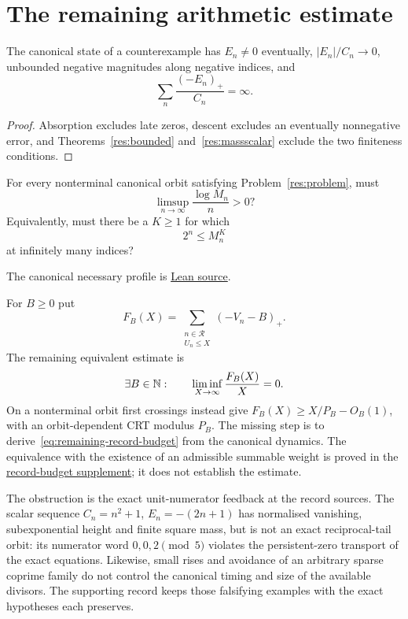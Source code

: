 \documentclass[11pt]{article}
\begin{document}
\section{The remaining arithmetic estimate}\label{sec:open}
\begin{proposition}\label{res:frontier}
The canonical state of a counterexample has $E_n\ne0$ eventually,
$|E_n|/C_n\to0$, unbounded negative magnitudes along negative indices,
and
\[
 \sum_n\frac{(-E_n)_+}{C_n}=\infty.
\]
\end{proposition}
\begin{proof}
Absorption excludes late zeros, descent excludes an eventually
nonnegative error, and Theorems~\ref{res:bounded} and~\ref{res:massscalar}
exclude the two finiteness conditions.
\end{proof}

\begin{problem}\label{res:lcmheight}
For every nonterminal canonical orbit satisfying Problem~\ref{res:problem},
must
\[
 \limsup_{n\to\infty}\frac{\log M_n}{n}>0?
\]
Equivalently, must there be a $K\ge1$ for which
\[
 2^n\le M_n^K
\]
at infinitely many indices?
\end{problem}
\noindent The canonical necessary profile is
\href{https://github.com/wcook04/plectis-erdos/blob/f36a98bf3d3e6f65f1074e3b800e3293d5b8a51a/ErdosProblems/Erdos243/PaperCompleteR7/Frontier.lean#L151}{Lean source}.

For $B\ge0$ put
\[
 F_B(X)=\sum_{\substack{n\in\mathcal R\\U_n\le X}}(-V_n-B)_+.
\]
The remaining equivalent estimate is
\begin{equation}\label{eq:remaining-record-budget}
 \exists B\in\mathbb{N}:\qquad\liminf_{X\to\infty}\frac{F_B(X)}X=0.
\end{equation}
On a nonterminal orbit first crossings instead give
$F_B(X)\ge X/P_B-O_B(1)$, with an orbit-dependent CRT modulus $P_B$.
The missing step is to derive~\eqref{eq:remaining-record-budget} from
the canonical dynamics. The equivalence with the existence of an
admissible summable weight is proved in the
\href{\repobase/\PX/Erdos243/LcmDefectCriterionReduction.md}
{record-budget supplement}; it does not establish the estimate.

The obstruction is the exact unit-numerator feedback at the record sources.
The scalar sequence $C_n=n^2+1$, $E_n=-(2n+1)$ has normalised vanishing,
subexponential height and finite square mass, but is not an exact
reciprocal-tail orbit: its numerator word $0,0,2\pmod5$ violates the
persistent-zero transport of the exact equations. Likewise, small rises
and avoidance of an arbitrary sparse coprime family do not control the
canonical timing and size of the available divisors. The supporting record
keeps those falsifying examples with the exact hypotheses each preserves.
\end{document}
